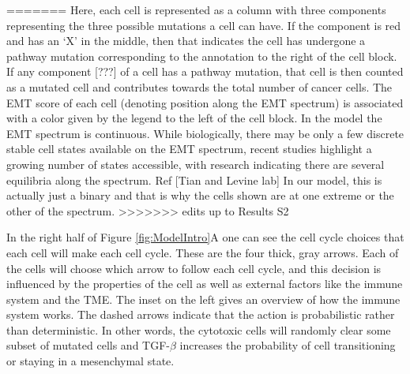 \documentclass{article}
\begin{document}

=======
Here, each cell is represented as a column with three components representing the three possible mutations a cell can have.
If the component is red and has an `X' in the middle, then that indicates the cell has undergone a pathway mutation corresponding to the annotation to the right of the cell block.
If any component [???] of a cell has a pathway mutation, that cell is then counted as a mutated cell and contributes towards the total number of cancer cells.
The EMT score of each cell (denoting position along the EMT spectrum) is associated with a color given by the legend to the left of the cell block. 
In the model the EMT spectrum is continuous. While biologically, there may be only a few discrete stable cell states available on the EMT spectrum, recent studies highlight a growing number of states accessible, with research indicating there are several equilibria along the spectrum. Ref [Tian and Levine lab] 
In our model, this is actually just a binary and that is why the cells shown are at one extreme or the other of the spectrum.
>>>>>>> edits up to Results S2



In the right half of Figure \ref{fig:ModelIntro}A one can see the cell cycle choices that each cell will make each cell cycle.
These are the four thick, gray arrows.
Each of the cells will choose which arrow to follow each cell cycle, and this decision is influenced by the properties of the cell as well as external factors like the immune system and the TME.
The inset on the left gives an overview of how the immune system works.
The dashed arrows indicate that the action is probabilistic rather than deterministic.
In other words, the cytotoxic cells will randomly clear some subset of mutated cells and TGF-$\beta$ increases the probability of cell transitioning or staying in a mesenchymal state.
\end{document}

